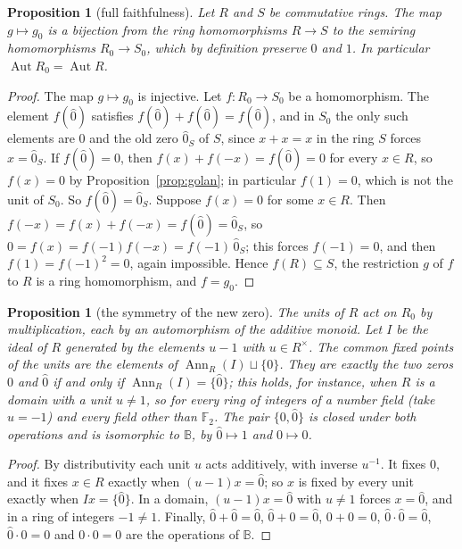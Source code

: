 \documentclass[11pt]{amsart}
\newtheorem{proposition}[thm]{Proposition}
\theoremstyle{remark}
\newcommand{\B}{\mathbb B}
\newcommand{\oz}{\widehat{0}}
\DeclareMathOperator{\Ann}{Ann}
\begin{document}
\begin{proposition}[full faithfulness]\label{prop:ff}
Let $R$ and $S$ be commutative rings. The map $g\mapsto g_0$ is a bijection from the ring homomorphisms $R\to S$ to the semiring homomorphisms $R_0\to S_0$, which by definition preserve $0$ and $1$. In particular $\operatorname{Aut}R_0=\operatorname{Aut}R$.
\end{proposition}

\begin{proof}
The map $g\mapsto g_0$ is injective. Let $f\colon R_0\to S_0$ be a homomorphism. The element $f(\oz)$ satisfies $f(\oz)+f(\oz)=f(\oz)$, and in $S_0$ the only such elements are $0$ and the old zero $\oz_S$ of $S$, since $x+x=x$ in the ring $S$ forces $x=\oz_S$. If $f(\oz)=0$, then $f(x)+f(-x)=f(\oz)=0$ for every $x\in R$, so $f(x)=0$ by Proposition~\ref{prop:golan}; in particular $f(1)=0$, which is not the unit of $S_0$. So $f(\oz)=\oz_S$. Suppose $f(x)=0$ for some $x\in R$. Then $f(-x)=f(x)+f(-x)=f(\oz)=\oz_S$, so $0=f(x)=f(-1)f(-x)=f(-1)\,\oz_S$; this forces $f(-1)=0$, and then $f(1)=f(-1)^2=0$, again impossible. Hence $f(R)\subseteq S$, the restriction $g$ of $f$ to $R$ is a ring homomorphism, and $f=g_0$.
\end{proof}

\begin{proposition}[the symmetry of the new zero]\label{prop:fix}
The units of $R$ act on $R_0$ by multiplication, each by an automorphism of the additive monoid. Let $I$ be the ideal of $R$ generated by the elements $u-1$ with $u\in R^\times$. The common fixed points of the units are the elements of $\Ann_R(I)\sqcup\{0\}$. They are exactly the two zeros $0$ and $\oz$ if and only if $\Ann_R(I)=\{\oz\}$; this holds, for instance, when $R$ is a domain with a unit $u\neq1$, so for every ring of integers of a number field (take $u=-1$) and every field other than $\mathbb F_2$. The pair $\{0,\oz\}$ is closed under both operations and is isomorphic to $\B$, by $\oz\mapsto1$ and $0\mapsto0$.
\end{proposition}

\begin{proof}
By distributivity each unit $u$ acts additively, with inverse $u^{-1}$. It fixes $0$, and it fixes $x\in R$ exactly when $(u-1)x=\oz$; so $x$ is fixed by every unit exactly when $Ix=\{\oz\}$. In a domain, $(u-1)x=\oz$ with $u\neq1$ forces $x=\oz$, and in a ring of integers $-1\neq1$. Finally, $\oz+\oz=\oz$, $\oz+0=\oz$, $0+0=0$, $\oz\cdot\oz=\oz$, $\oz\cdot0=0$ and $0\cdot0=0$ are the operations of $\B$.
\end{proof}
\end{document}
